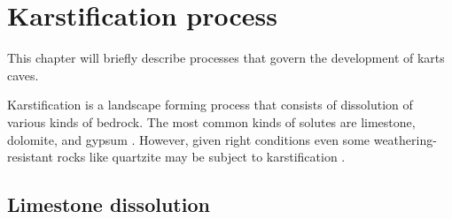\chapter{Karstification process}
This chapter will briefly describe processes that govern the development
of karts caves.

Karstification is a landscape forming process that consists of dissolution
of various kinds of bedrock. The most common kinds of solutes are limestone,
dolomite, and gypsum \parencite{karstglossary}. However, given right conditions
even some weathering-resistant rocks like quartzite may be subject to 
karstification \parencite{migon2010}.

\section{Limestone dissolution}
